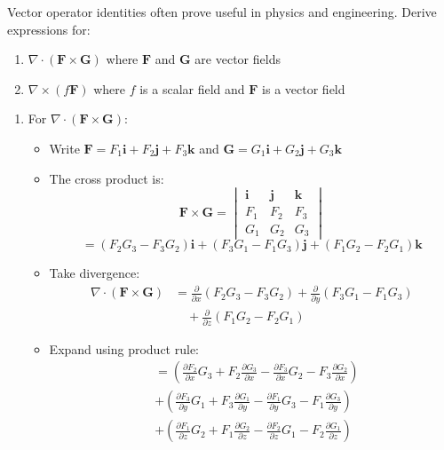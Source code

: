 \exampleline
\begin{example}
Vector operator identities often prove useful in physics and engineering. Derive expressions for:
\begin{enumerate}
   \item $\nabla \cdot (\mathbf{F} \times \mathbf{G})$ where $\mathbf{F}$ and $\mathbf{G}$ are vector fields
   \item $\nabla \times (f\mathbf{F})$ where $f$ is a scalar field and $\mathbf{F}$ is a vector field
\end{enumerate}

\begin{solution}
\begin{enumerate}
\item For $\nabla \cdot (\mathbf{F} \times \mathbf{G})$:
\begin{itemize}
   \item Write $\mathbf{F} = F_1\mathbf{i} + F_2\mathbf{j} + F_3\mathbf{k}$ and $\mathbf{G} = G_1\mathbf{i} + G_2\mathbf{j} + G_3\mathbf{k}$
   
   \item The cross product is:
   \[
   \mathbf{F} \times \mathbf{G} = \begin{vmatrix} 
   \mathbf{i} & \mathbf{j} & \mathbf{k} \\
   F_1 & F_2 & F_3 \\
   G_1 & G_2 & G_3
   \end{vmatrix}
   \]
   \[
   = (F_2G_3 - F_3G_2)\mathbf{i} + (F_3G_1 - F_1G_3)\mathbf{j} + (F_1G_2 - F_2G_1)\mathbf{k}
   \]

   \item Take divergence:
   \begin{align*}
   \nabla \cdot (\mathbf{F} \times \mathbf{G}) &= \frac{\partial}{\partial x}(F_2G_3 - F_3G_2) + \frac{\partial}{\partial y}(F_3G_1 - F_1G_3) \\
   &\quad + \frac{\partial}{\partial z}(F_1G_2 - F_2G_1)
   \end{align*}

   \item Expand using product rule:
   \begin{align*}
   &= \left(\frac{\partial F_2}{\partial x}G_3 + F_2\frac{\partial G_3}{\partial x} - \frac{\partial F_3}{\partial x}G_2 - F_3\frac{\partial G_2}{\partial x}\right) \\
   &+ \left(\frac{\partial F_3}{\partial y}G_1 + F_3\frac{\partial G_1}{\partial y} - \frac{\partial F_1}{\partial y}G_3 - F_1\frac{\partial G_3}{\partial y}\right) \\
   &+ \left(\frac{\partial F_1}{\partial z}G_2 + F_1\frac{\partial G_2}{\partial z} - \frac{\partial F_2}{\partial z}G_1 - F_2\frac{\partial G_1}{\partial z}\right)
   \end{align*}


\end{itemize}
\end{enumerate}
\end{solution}
\end{example}

